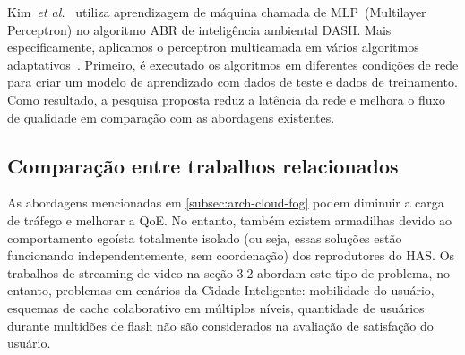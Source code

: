 Kim~\textit{et al.}~\cite{Kim2018}
utiliza aprendizagem de máquina chamada de MLP~(Multilayer Perceptron) no algoritmo ABR de inteligência ambiental DASH. Mais especificamente, aplicamos o perceptron multicamada em vários algoritmos adaptativos~\cite{Vergados2016SysJ}. Primeiro, é executado os algoritmos em diferentes condições de rede para criar um modelo de aprendizado com dados de teste e dados de treinamento. 
Como resultado, a pesquisa proposta reduz a latência da rede e melhora o fluxo de qualidade em comparação com as abordagens existentes.

\subsection{Comparação entre trabalhos relacionados}
\label{subsec:applications}

As abordagens mencionadas em \autoref{subsec:arch-cloud-fog} podem diminuir a carga de tráfego 
e melhorar a QoE. No entanto, também existem armadilhas devido ao comportamento egoísta totalmente isolado (ou seja, essas soluções estão funcionando independentemente, sem coordenação) dos reprodutores do HAS.%
Os trabalhos de streaming de video na seção 3.2 abordam este tipo de problema, no entanto, problemas em cenários da Cidade Inteligente: mobilidade do usuário, esquemas de cache colaborativo em múltiplos níveis, quantidade de usuários durante multidões de flash não são considerados na avaliação de satisfação do usuário. %


